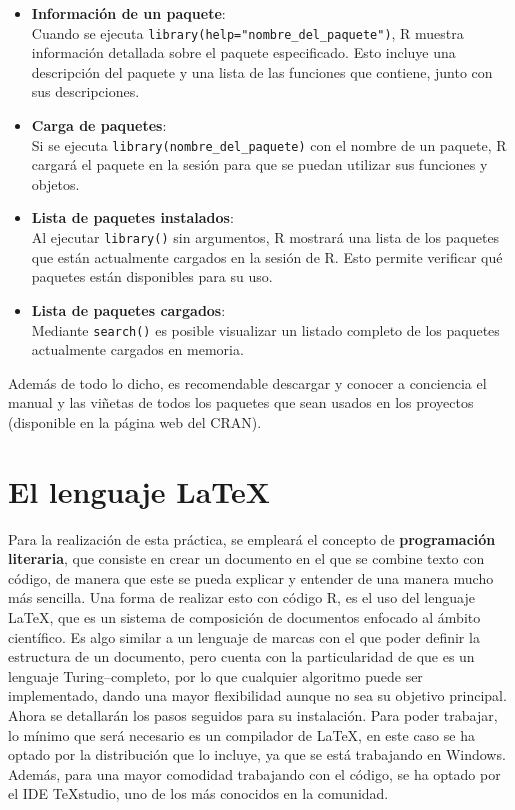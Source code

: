 \documentclass[12pt]{report}\usepackage[]{graphicx}\usepackage[dvipsnames]{xcolor}
\begin{document}
\begin{itemize}
				\item \textbf{Información de un paquete}: \\
				Cuando se ejecuta \texttt{library(help="nombre\_del\_paquete")}, R muestra información detallada sobre el paquete especificado. Esto incluye una descripción del paquete y una lista de las funciones que contiene, junto con sus descripciones.
				
				\item \textbf{Carga de paquetes}: \\
				Si se ejecuta \texttt{library(nombre\_del\_paquete)} con el nombre de un paquete, R cargará el paquete en la sesión para que se puedan utilizar sus funciones y objetos.
				
				\item \textbf{Lista de paquetes instalados}: \\
				Al ejecutar \texttt{library()} sin argumentos, R mostrará una lista de los paquetes que están actualmente cargados en la sesión de R. Esto permite verificar qué paquetes están disponibles para su uso.
				
				\item \textbf{Lista de paquetes cargados}: \\
				Mediante \texttt{search()} es posible visualizar un listado completo de los paquetes actualmente cargados en memoria.
				
			\end{itemize}
			
			Además de todo lo dicho, es recomendable descargar y conocer a conciencia el manual y las viñetas de todos los paquetes que sean usados en los proyectos (disponible en la página web del CRAN).
		
		\section*{El lenguaje \LaTeX}

			Para la realización de esta práctica, se empleará el concepto de \textbf{programación literaria}, que consiste en crear un documento en el que se combine texto con código, de manera que este se pueda explicar y entender de una manera mucho más sencilla. Una forma de realizar esto con código R, es el uso del lenguaje \LaTeX{}, que es un sistema de composición de documentos enfocado al ámbito científico. Es algo similar a un lenguaje de marcas con el que poder definir la estructura de un documento, pero cuenta con la particularidad de que es un lenguaje Turing--completo, por lo que cualquier algoritmo puede ser implementado, dando una mayor flexibilidad aunque no sea su objetivo principal. Ahora se detallarán los pasos seguidos para su instalación. Para poder trabajar, lo mínimo que será necesario es un compilador de \LaTeX{}, en este caso se ha optado por la distribución  que lo incluye, ya que se está trabajando en Windows. Además, para una mayor comodidad trabajando con el código, se ha optado por el IDE \TeX{}studio, uno de los más conocidos en la comunidad. \\
			
\end{document}
